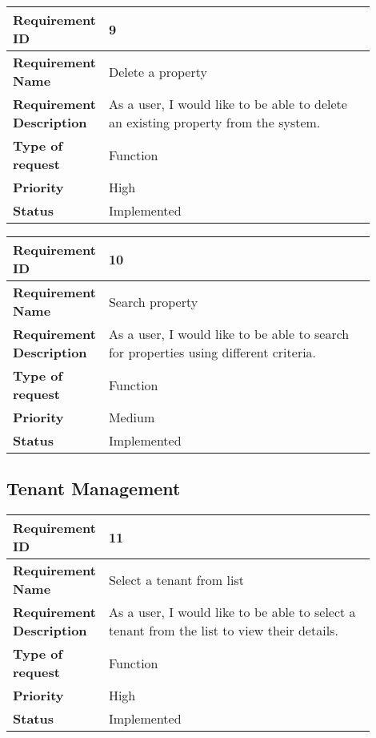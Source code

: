   \begin{table}[htbp]
  \centering
\begin{tabular}{|m{0.15\linewidth}|m{0.75\linewidth}|}
    \hline
    \textbf{Requirement ID} & 9 \\
    \hline
    \textbf{Requirement Name} &  Delete a property \\
    \hline
    \textbf{Requirement Description} & As a user, I would like to be able to delete an existing property from the system. \\
    \hline
    \textbf{Type of request} & Function \\
    \hline
    \textbf{Priority} & High \\
    \hline
    \textbf{Status} & Implemented \\
    \hline
  \end{tabular}
\end{table}

\begin{table}[htbp]
\centering
\begin{tabular}{|m{0.15\linewidth}|m{0.75\linewidth}|}
\hline
\textbf{Requirement ID} & 10 \\
\hline
\textbf{Requirement Name} & Search property \\
\hline
\textbf{Requirement Description} & As a user, I would like to be able to search for properties using different criteria. \\
\hline
\textbf{Type of request} & Function \\
\hline
\textbf{Priority} & Medium \\
\hline
\textbf{Status} & Implemented \\
\hline
\end{tabular}
\end{table}

\newpage
\subsection{Tenant Management}
\begin{table}[htbp]
\centering
\begin{tabular}{|m{0.15\linewidth}|m{0.75\linewidth}|}
\hline
\textbf{Requirement ID} & 11 \\
\hline
\textbf{Requirement Name} & Select a tenant from list \\
\hline
\textbf{Requirement Description} & As a user, I would like to be able to select a tenant from the list to view their details. \\
\hline
\textbf{Type of request} & Function \\
\hline
\textbf{Priority} & High \\
\hline
\textbf{Status} & Implemented \\
\hline
\end{tabular}
\end{table}

